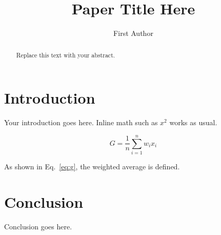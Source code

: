 \documentclass{llncs}
\begin{document}
\title{Paper Title Here}
\author{First Author}
\maketitle

\begin{abstract}
Replace this text with your abstract.
\end{abstract}

\section{Introduction}
Your introduction goes here. Inline math such as $x^2$ works as usual.

\begin{equation}
G = \frac{1}{n}\sum_{i=1}^{n} w_i x_i
\label{eq:g}
\end{equation}

As shown in Eq.~\ref{eq:g}, the weighted average is defined.

\section{Conclusion}
Conclusion goes here.
\end{document}
